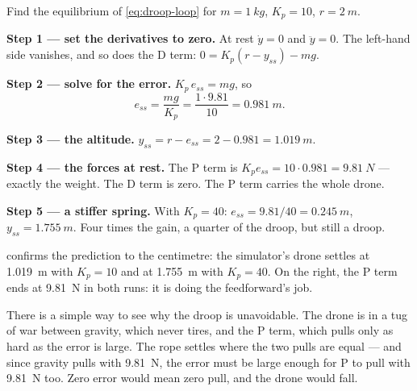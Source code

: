 \begin{example}
\label{ex:droop-ess}
Find the equilibrium of \cref{eq:droop-loop} for $m = \SI{1}{kg}$, $K_p = 10$, $r = \SI{2}{m}$.

\textbf{Step 1 — set the derivatives to zero.} At rest $\dot y = 0$ and $\ddot y = 0$. The left-hand side vanishes, and so does the D term:
$0 = K_p(r - y_{ss}) - mg$.

\textbf{Step 2 — solve for the error.} $K_p\,e_{ss} = mg$, so
\begin{equation}\label{eq:droop-ess}
  e_{ss} = \frac{mg}{K_p} = \frac{1 \cdot 9.81}{10} = \SI{0.981}{m}.
\end{equation}

\textbf{Step 3 — the altitude.} $y_{ss} = r - e_{ss} = 2 - 0.981 = \SI{1.019}{m}$.

\textbf{Step 4 — the forces at rest.} The P term is $K_p e_{ss} = 10 \cdot 0.981 = \SI{9.81}{N}$ — exactly the weight. The D term is zero. The P term carries the whole drone.

\textbf{Step 5 — a stiffer spring.} With $K_p = 40$: $e_{ss} = 9.81/40 = \SI{0.245}{m}$, $y_{ss} = \SI{1.755}{m}$. Four times the gain, a quarter of the droop, but still a droop.
\end{example}

 confirms the prediction to the centimetre: the simulator's drone settles at \SI{1.019}{m} with $K_p = 10$ and at \SI{1.755}{m} with $K_p = 40$. On the right, the P term ends at \SI{9.81}{N} in both runs: it is doing the feedforward's job.



There is a simple way to see why the droop is unavoidable. The drone is in a tug of war between gravity, which never tires, and the P term, which pulls only as hard as the error is large. The rope settles where the two pulls are equal — and since gravity pulls with \SI{9.81}{N}, the error must be large enough for P to pull with \SI{9.81}{N} too. Zero error would mean zero pull, and the drone would fall.

